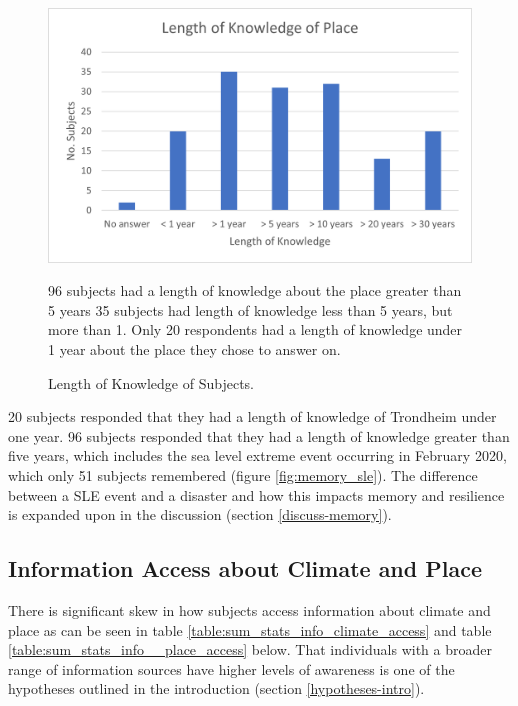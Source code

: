\begin{figure}[H]
    \centering
    \includegraphics{fig_results/long_know.png}
    \caption{Length of Knowledge of Subjects.}{ 96 subjects had a length of knowledge about the place greater than 5 years 35 subjects had length of knowledge less than 5 years, but more than 1. Only 20 respondents had a length of knowledge under 1 year about the place they chose to answer on.}
    \label{fig:long_know}
\end{figure}

20 subjects responded that they had a length of knowledge of Trondheim under one year. 96 subjects responded that they had a length of knowledge greater than five years, which includes the sea level extreme event occurring in February 2020, which only 51 subjects remembered (figure \ref{fig:memory_sle}). The difference between a SLE event and a disaster and how this impacts memory and resilience is expanded upon in the discussion (section \ref{discuss-memory}).


\subsection{Information Access about Climate and Place}

There is significant skew in how subjects access information about climate and place as can be seen in table \ref{table:sum_stats_info_climate_access} and table \ref{table:sum_stats_info__place_access} below. That individuals with a broader range of information sources have higher levels of awareness is one of the hypotheses outlined in the introduction (section \ref{hypotheses-intro}). 

